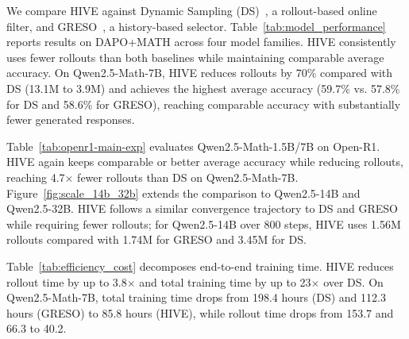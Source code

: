 We compare HIVE against Dynamic Sampling (DS)~\cite{yu2025dapo}, a rollout-based online filter, and GRESO~\cite{zheng2025act}, a history-based selector. Table~\ref{tab:model_performance} reports results on DAPO+MATH across four model families. HIVE consistently uses fewer rollouts than both baselines while maintaining comparable average accuracy. On Qwen2.5-Math-7B, HIVE reduces rollouts by 70\% compared with DS (13.1M to 3.9M) and achieves the highest average accuracy (59.7\% vs. 57.8\% for DS and 58.6\% for GRESO), reaching comparable accuracy with substantially fewer generated responses.

Table~\ref{tab:openr1-main-exp} evaluates Qwen2.5-Math-1.5B/7B on Open-R1. HIVE again keeps comparable or better average accuracy while reducing rollouts, reaching 4.7$\times$ fewer rollouts than DS on Qwen2.5-Math-7B. Figure~\ref{fig:scale_14b_32b} extends the comparison to Qwen2.5-14B and Qwen2.5-32B. HIVE follows a similar convergence trajectory to DS and GRESO while requiring fewer rollouts; for Qwen2.5-14B over 800 steps, HIVE uses 1.56M rollouts compared with 1.74M for GRESO and 3.45M for DS.

Table~\ref{tab:efficiency_cost} decomposes end-to-end training time. HIVE reduces rollout time by up to 3.8$\times$ and total training time by up to 23$\times$ over DS. On Qwen2.5-Math-7B, total training time drops from 198.4 hours (DS) and 112.3 hours (GRESO) to 85.8 hours (HIVE), while rollout time drops from 153.7 and 66.3 to 40.2.

